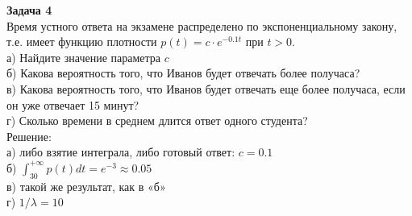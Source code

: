 \documentclass[12pt, a4paper]{article}\usepackage[]{graphicx}\usepackage[]{color}
\begin{document}
\textbf{Задача 4} \\ %
Время устного ответа на экзамене распределено по экспоненциальному закону, т.е. имеет функцию плотности $p(t)=c\cdot e^{-0.1t}$ при $t>0$. \\
а) Найдите значение параметра $c$ \\
б) Какова вероятность того, что Иванов будет отвечать более получаса? \\
в) Какова вероятность того, что Иванов будет отвечать еще более получаса, если он уже отвечает 15 минут? \\
г) Сколько времени в среднем длится ответ одного студента? \\
Решение: \\
а) либо взятие интеграла, либо готовый ответ: $c=0.1$ \\
б) $\int_{30}^{+\infty}p(t)dt=e^{-3}\approx 0.05$ \\
в) такой же результат, как в «б» \\
г) $1/\lambda=10$ \\




\end{document}

